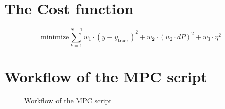\section{The Cost function}
\label{section:thecostfunction}
\begin{equation}
    \text{minimize} \sum_{k=1}^{N-1} w_\text{1}\cdot (y-y_\text{track})^2 + w_\textbf{2}\cdot(u_\text{2}\cdot dP)^2 + w_\text{3} \cdot \eta^2
\end{equation}
\section{Workflow of the MPC script}
\label{section:workflowMPC}
\begin{figure}[h]
            \centering
            \def\svgwidth{0.6\textwidth}
            
            \caption{Workflow of the MPC script}
            \label{fig:workflowMPC}
    \end{figure}